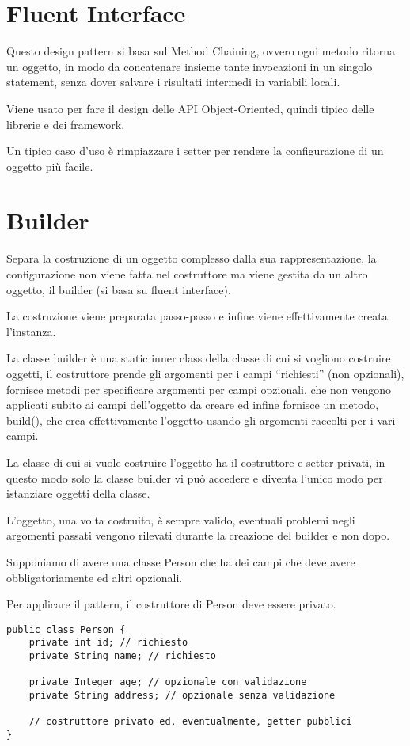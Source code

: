 \section{Fluent Interface}

Questo design pattern si basa sul Method Chaining, ovvero ogni metodo ritorna un oggetto, in modo da concatenare insieme tante invocazioni in un singolo statement, 
senza dover salvare i risultati intermedi in variabili locali.

Viene usato per fare il design delle API Object-Oriented, quindi tipico delle librerie e dei framework.

Un tipico caso d’uso è rimpiazzare i setter per rendere la configurazione di un oggetto più facile.

\section{Builder}

Separa la costruzione di un oggetto complesso dalla sua rappresentazione, la configurazione non viene fatta nel costruttore ma viene gestita da un altro oggetto, 
il builder (si basa su fluent interface).

La costruzione viene preparata passo-passo e infine viene effettivamente creata l’instanza.

La classe builder è una static inner class della classe di cui si vogliono costruire oggetti, il costruttore prende gli argomenti per i campi “richiesti” 
(non opzionali), fornisce metodi per specificare argomenti per campi opzionali, che non vengono applicati subito ai campi dell’oggetto da creare ed infine fornisce un 
metodo, build(), che crea effettivamente l’oggetto usando gli argomenti raccolti per i vari campi.

La classe di cui si vuole costruire l'oggetto ha il costruttore e setter privati, in questo modo solo la classe builder vi può accedere e diventa l’unico modo per 
istanziare oggetti della classe.

L’oggetto, una volta costruito, è sempre valido, eventuali problemi negli argomenti passati vengono rilevati durante la creazione del builder e non dopo.

Supponiamo di avere una classe Person che ha dei campi che deve avere obbligatoriamente ed altri opzionali.

Per applicare il pattern, il costruttore di Person deve essere privato.

\begin{lstlisting}
public class Person {
    private int id; // richiesto
    private String name; // richiesto

    private Integer age; // opzionale con validazione
    private String address; // opzionale senza validazione

    // costruttore privato ed, eventualmente, getter pubblici
}
\end{lstlisting}


